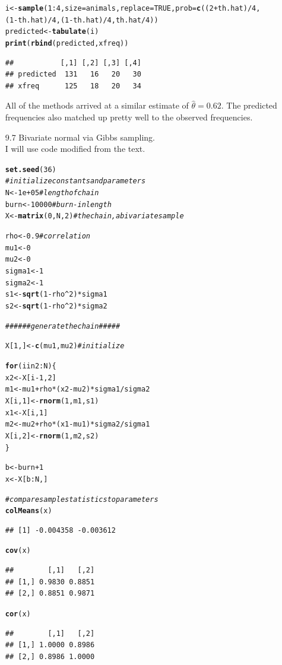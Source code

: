 \documentclass{article}\usepackage[]{graphicx}\usepackage[]{color}
\makeatletter
\newcommand{\hlcom}[1]{\textcolor[rgb]{0.678,0.584,0.686}{\textit{#1}}}%
\newcommand{\hlkwd}[1]{\textcolor[rgb]{0.737,0.353,0.396}{\textbf{#1}}}%
\newenvironment{kframe}{%
 \def\at@end@of@kframe{}%
 \ifinner\ifhmode%
  \def\at@end@of@kframe{\end{minipage}}%
  \begin{minipage}{\columnwidth}%
 \fi\fi%
 \def\FrameCommand##1{\hskip\@totalleftmargin \hskip-\fboxsep
 \colorbox{shadecolor}{##1}\hskip-\fboxsep
     \hskip-\linewidth \hskip-\@totalleftmargin \hskip\columnwidth}%
 \MakeFramed {\advance\hsize-\width
   \@totalleftmargin\z@ \linewidth\hsize
   \@setminipage}}%
 {\par\unskip\endMakeFramed%
 \at@end@of@kframe}
\newenvironment{knitrout}{}{} %
\makeatother
\begin{document}
\begin{itemize}
\begin{knitrout}
\begin{kframe}
\begin{alltt}
i <- \hlkwd{sample}(1:4, size=animals, replace=TRUE,prob=\hlkwd{c}((2+th.hat)/4, 
                  (1-th.hat)/4, (1-th.hat)/4, th.hat/4))
predicted <- \hlkwd{tabulate}(i)
\hlkwd{print}(\hlkwd{rbind}(predicted,xfreq))
\end{alltt}
\begin{verbatim}
##           [,1] [,2] [,3] [,4]
## predicted  131   16   20   30
## xfreq      125   18   20   34
\end{verbatim}
\end{kframe}
\end{knitrout}

All of the methods arrived at a similar estimate of $\hat{\theta}=0.62$. The predicted frequencies also matched up pretty well to the observed frequencies.\\

\item[9.7]  Bivariate normal via Gibbs sampling.\\
I will use code modified from the text.
\begin{knitrout}
\color{fgcolor}\begin{kframe}
\begin{alltt}
\hlkwd{set.seed}(36)
\hlcom{# initialize constants and parameters}
N <- 1e+05  \hlcom{#length of chain}
burn <- 10000  \hlcom{#burn-in length}
X <- \hlkwd{matrix}(0, N, 2)  \hlcom{#the chain, a bivariate sample}

rho <- 0.9  \hlcom{#correlation}
mu1 <- 0
mu2 <- 0
sigma1 <- 1
sigma2 <- 1
s1 <- \hlkwd{sqrt}(1 - rho^2) * sigma1
s2 <- \hlkwd{sqrt}(1 - rho^2) * sigma2

\hlcom{###### generate the chain #####}

X[1, ] <- \hlkwd{c}(mu1, mu2)  \hlcom{#initialize}

\hlkwd{for} (i in 2:N) \{
    x2 <- X[i - 1, 2]
    m1 <- mu1 + rho * (x2 - mu2) * sigma1/sigma2
    X[i, 1] <- \hlkwd{rnorm}(1, m1, s1)
    x1 <- X[i, 1]
    m2 <- mu2 + rho * (x1 - mu1) * sigma2/sigma1
    X[i, 2] <- \hlkwd{rnorm}(1, m2, s2)
\}

b <- burn + 1
x <- X[b:N, ]

\hlcom{# compare sample statistics to parameters}
\hlkwd{colMeans}(x)
\end{alltt}
\begin{verbatim}
## [1] -0.004358 -0.003612
\end{verbatim}
\begin{alltt}
\hlkwd{cov}(x)
\end{alltt}
\begin{verbatim}
##        [,1]   [,2]
## [1,] 0.9830 0.8851
## [2,] 0.8851 0.9871
\end{verbatim}
\begin{alltt}
\hlkwd{cor}(x)
\end{alltt}
\begin{verbatim}
##        [,1]   [,2]
## [1,] 1.0000 0.8986
## [2,] 0.8986 1.0000
\end{verbatim}
\begin{alltt}


\end{alltt}
\end{kframe}
\end{knitrout}
\end{itemize}
\end{document}
